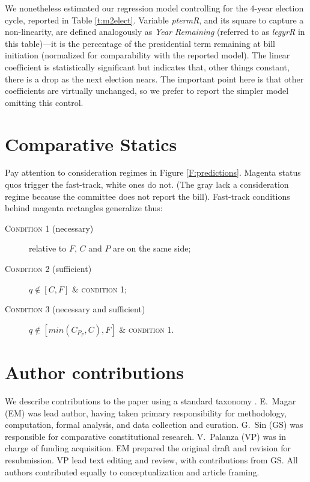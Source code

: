 \documentclass[letter,12pt]{article}
\begin{document}
We nonetheless estimated our regression model controlling for the 4-year election cycle, reported in Table \ref{t:m2elect}. Variable \emph{ptermR}, and its square to capture a non-linearity, are defined analogously as \emph{Year Remaining} (referred to as \emph{legyrR} in this table)---it is the percentage of the presidential term remaining at bill initiation (normalized for comparability with the reported model). The linear coefficient is statistically significant but indicates that, other things constant, there is a drop as the next election nears. The important point here is that other coefficients are virtually unchanged, so we prefer to report the simpler model omitting this control. 

\section{Comparative Statics}

Pay attention to consideration regimes in Figure \ref{F:predictions}. Magenta status quos trigger the fast-track, white ones do not. (The gray lack a consideration regime because the committee does not report the bill). Fast-track conditions behind magenta rectangles generalize thus:  

\begin{description}
\item[\textsc{Condition 1} (necessary)] relative to $F$, $C$ and $P$ are on the same side; 
\item[\textsc{Condition 2} (sufficient)]  $q \notin [C,F]$ \& \textsc{condition 1};
\item[\textsc{Condition 3} (necessary and sufficient)] $q \notin [min(C_{P_F},C),F]$ \& \textsc{condition 1}.
\end{description}

\section{Author contributions}

We describe contributions to the paper using a standard taxonomy \citep{allen2014credit}. E.\ Magar (EM) was lead author, having taken primary responsibility for methodology, computation, formal analysis, and data collection and curation. G.\ Sin (GS) was responsible for comparative constitutional research. V.\ Palanza (VP) was in charge of funding acquisition. EM prepared the original draft and revision for resubmission. VP lead text editing and review, with contributions from GS. All authors contributed equally to conceptualization and article framing. 
\end{document}
